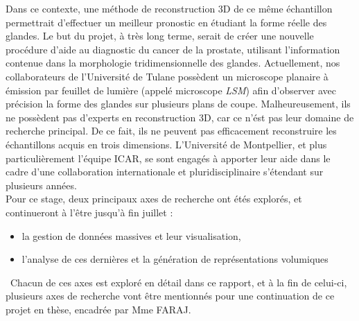 {	Dans ce contexte, une méthode de reconstruction 3D de ce même échantillon permettrait d'effectuer un meilleur pronostic en étudiant la forme réelle des glandes. Le but du projet, à très long terme, serait de créer une nouvelle procédure d'aide au diagnostic du cancer de la prostate, utilisant l'information contenue dans la morphologie tridimensionnelle des glandes. Actuellement, nos collaborateurs de l'Université de Tulane possèdent un microscope planaire à émission par feuillet de lumière (appelé microscope \textit{LSM}) afin d'observer avec précision la forme des glandes sur plusieurs plans de coupe. Malheureusement, ils ne possèdent pas d'experts en reconstruction 3D, car ce n'ést pas leur domaine de recherche principal. De ce fait, ils ne peuvent pas efficacement reconstruire les échantillons acquis en trois dimensions. L'Université de Montpellier, et plus particulièrement l'équipe ICAR, se sont engagés à apporter leur aide dans le cadre d'une collaboration internationale et pluridisciplinaire s'étendant sur plusieurs années.\\Pour ce stage, deux principaux axes de recherche ont étés explorés, et continueront à l'être jusqu'à fin juillet :\begin{itemize}
		\item la gestion de données massives et leur visualisation,
		\item l'analyse de ces dernières et la génération de représentations volumiques
	\end{itemize}\par~Chacun de ces axes est exploré en détail dans ce rapport, et à la fin de celui-ci, plusieurs axes de recherche vont être mentionnés pour une continuation de ce projet en thèse, encadrée par Mme \textsc{FARAJ}.\\
}
